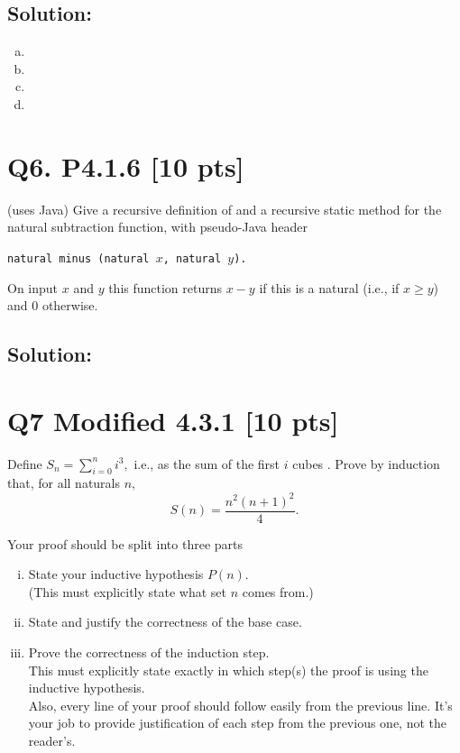 \documentclass[12pt]{article}
\begin{document}
\subsection*{\textbf{Solution:}}
\begin{enumerate}[(a)]
    \item 
    \item 
    \item 
    \item
\end{enumerate}


\newpage
\section*{\textbf{Q6. P4.1.6} [10 pts]}
 (uses Java) Give a recursive definition of and a recursive static method for the natural subtraction function, with pseudo-Java header
 
 \begin{center}
     \texttt{natural minus (natural $x$, natural $y$).}
 \end{center}
 On input $x$ and $y$ this function returns $x - y$ if this is a natural (i.e., if $x \geq y$) and 0 otherwise.

\subsection*{\textbf{Solution:}}

\newpage



\section*{Q7  Modified 4.3.1 [10 pts]}



Define $S_n = \sum_{i=0}^n i^3,$ i.e., as the sum of the first $i$ cubes . Prove by induction that, for all naturals $n,$ 
\begin{equation}
        S(n) = \frac  {n^2(n+1)^2} 4. 
\end{equation}

Your proof should be split into three parts

\begin{enumerate}[(i)]
    \item State your inductive hypothesis $P(n).$ \\
    (This must explicitly  state what set $n$ comes from.)
    \item State and justify the correctness of the base case.
    \item Prove the correctness of the induction step. \\This must explicitly state exactly  in which step(s) the proof   is using the inductive hypothesis.\\
    Also, every line of your proof should follow easily from the previous line. It's your job to provide justification of each step from the previous one,  not the reader's.  
\end{enumerate}
\end{document}
